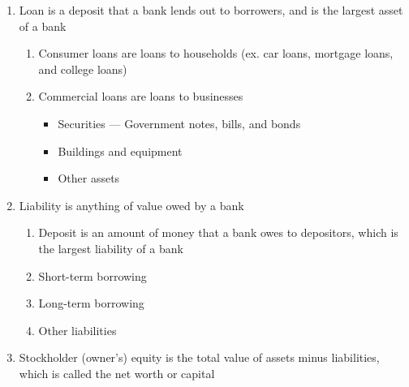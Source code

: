 \documentclass[12pt]{article}
\begin{document}
\begin{enumerate}
\begin{enumerate}
\begin{enumerate}
\begin{enumerate}
                \end{enumerate}

              \item Loan is a deposit that a bank lends out to borrowers, and is the largest asset of a bank

                \begin{enumerate}

                  \item Consumer loans are loans to households (ex. car loans, mortgage loans, and college loans)

                  \item Commercial loans are loans to businesses

                    \begin{itemize}

                      \item Securities — Government notes, bills, and bonds

                      \item Buildings and equipment

                      \item Other assets

                    \end{itemize}

                \end{enumerate}

              \item Liability is anything of value owed by a bank

                \begin{enumerate}

                  \item Deposit is an amount of money that a bank owes to depositors, which is the largest liability of a bank

                  \item Short-term borrowing

                  \item Long-term borrowing

                  \item Other liabilities

                \end{enumerate}

              \item Stockholder (owner's) equity is the total value of assets minus liabilities, which is called the net worth or capital


\end{enumerate}
\end{enumerate}
\end{enumerate}
\end{document}
